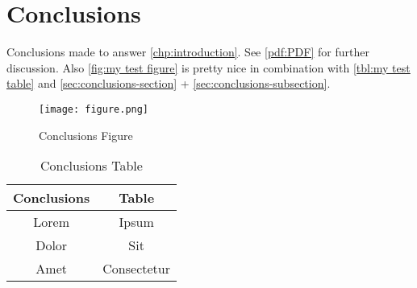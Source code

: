 \chapter{Conclusions}
\label{chp:conclusions}

Conclusions made to answer \autoref{chp:introduction}. See \autoref{pdf:PDF} for further discussion. Also \autoref{fig:my test figure} is pretty nice in combination with \autoref{tbl:my test table} and \autoref{sec:conclusions-section} + \autoref{sec:conclusions-subsection}.

\begin{figure}
    \centering
    \texttt{[image: figure.png]}
    \caption{Conclusions Figure}
    \label{fig:my test figure}
\end{figure}

\begin{table}
    \centering
    \begin{tabular}{|c|c|}
        \hline
        \textbf{Conclusions} & \textbf{Table} \\
        \hline
        Lorem                & Ipsum          \\
        Dolor                & Sit            \\
        Amet                 & Consectetur    \\
        \hline
    \end{tabular}
    \caption{Conclusions Table}
    \label{tbl:my test table}
\end{table}


